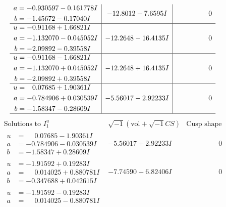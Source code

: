 \documentclass[1p]{elsarticle_modified}
\theoremstyle{definition}
\newcommand{\I}{\sqrt{-1}}
\begin{document}
$$\begin{array}{c|c|c}
\begin{aligned}
a &= -0.930597 - 0.161778 I \\
b &= -1.45672 - 0.17040 I\end{aligned}
 & -12.8012 - 7.6595 I & \phantom{-0.000000 } 0 \\ \hline\begin{aligned}
u &= -0.91168 + 1.66821 I \\
a &= -1.132070 - 0.045052 I \\
b &= -2.09892 - 0.39558 I\end{aligned}
 & -12.2648 - 16.4135 I & \phantom{-0.000000 } 0 \\ \hline\begin{aligned}
u &= -0.91168 - 1.66821 I \\
a &= -1.132070 + 0.045052 I \\
b &= -2.09892 + 0.39558 I\end{aligned}
 & -12.2648 + 16.4135 I & \phantom{-0.000000 } 0 \\ \hline\begin{aligned}
u &= \phantom{-}0.07685 + 1.90361 I \\
a &= -0.784906 + 0.030539 I \\
b &= -1.58347 - 0.28609 I\end{aligned}
 & -5.56017 - 2.92233 I & \phantom{-0.000000 } 0\\
 \hline 
 \end{array}$$\newpage$$\begin{array}{c|c|c}  
\text{Solutions to }I^u_{1}& \I (\text{vol} + \sqrt{-1}CS) & \text{Cusp shape}\\
 \hline 
\begin{aligned}
u &= \phantom{-}0.07685 - 1.90361 I \\
a &= -0.784906 - 0.030539 I \\
b &= -1.58347 + 0.28609 I\end{aligned}
 & -5.56017 + 2.92233 I & \phantom{-0.000000 } 0 \\ \hline\begin{aligned}
u &= -1.91592 + 0.19283 I \\
a &= \phantom{-}0.014025 + 0.880781 I \\
b &= -0.347688 + 0.042615 I\end{aligned}
 & -7.74590 + 6.82406 I & \phantom{-0.000000 } 0 \\ \hline\begin{aligned}
u &= -1.91592 - 0.19283 I \\
a &= \phantom{-}0.014025 - 0.880781 I \\

\end{aligned}
\end{array}$$
\end{document}
